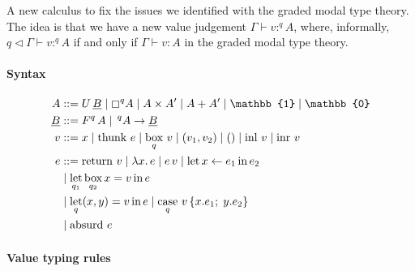 \documentclass[acmsmall,screen,nonacm]{acmart}
\DeclareMathOperator{\llet}{\text{let}}
\DeclareMathOperator{\lin}{\text{in}}
\DeclareMathOperator{\case}{\text{case}}
\DeclareMathOperator{\bbox}{\text{box}}
\DeclareMathOperator{\thunk}{\text{thunk}}
\DeclareMathOperator{\return}{\text{return}}
\newcommand{\unit}{\mathbb{1}}
\newcommand{\zero}{\mathbb{0}}
\DeclareMathOperator{\inl}{\text{inl}}
\DeclareMathOperator{\inr}{\text{inr}}
\DeclareMathOperator{\absurd}{\text{absurd}}
\newcommand{\tee}{\vdash}
\DeclareMathOperator{\scale}{\mathbin{\triangleleft}}
\DeclareMathOperator{\boxop}{\mathbin{\triangleright}}
\begin{document}
A new calculus to fix the issues we identified with the graded modal type theory.
The idea is that we have a new value judgement $\Gamma \tee v :^q A$,
where, informally, $q\scale\Gamma \tee v :^q A$ if and only if
$\Gamma \tee v : A$ in the graded modal type theory.

\paragraph{Syntax}

\begin{align*}
  A &::= U\, \underline{B} \mid \boxempty^q A \mid A \times A' \mid A + A' \mid \unit \mid \zero \\
  \underline{B} &::= F^q\, A \mid \,^q A \rightarrow \underline{B} \\
  v &::= x \mid \thunk\, e \mid \bbox_q\, v \mid (v_1, v_2) \mid () \mid \inl\, v \mid \inr\, v \\
  e &::= \return\, v \mid \lambda x.\, e \mid e\, v
      \mid \llet x \leftarrow e_1 \lin e_2 \\
    &\mid \llet_{q_1} \bbox_{q_2} x = v \lin e \\
    &\mid \llet_q (x, y) = v \lin e
      \mid \case_q\, v\, \{x.e_1;\; y.e_2\} \\
    &\mid \absurd \, e
\end{align*}

\paragraph{Value typing rules} \hfill \framebox{$\Gamma \tee v :^q A$}

\end{document}
